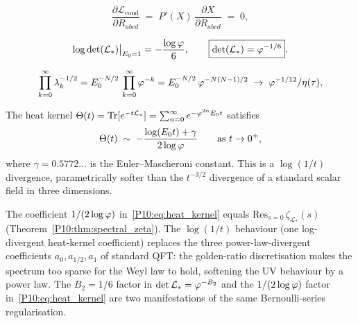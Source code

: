 \begin{equation}
  \frac{\partial\mathcal{L}_\mathrm{cond}}{\partial R_{abcd}}
  \;=\; P'(X)\,\frac{\partial X}{\partial R_{abcd}}
  \;=\; 0,
  \label{P10:eq:dLcond}
\end{equation}

\begin{equation}
  \log\det(\mathcal{L}_*)\big|_{E_0=1}
  = -\frac{\log\varphi}{6},
  \qquad
  \boxed{\det(\mathcal{L}_*) = \varphi^{-1/6}}.
  \label{P10:eq:det_E01}
\end{equation}

\begin{equation}
  \prod_{k=0}^\infty \lambda_k^{-1/2}
  = E_0^{-N/2}\,\prod_{k=0}^\infty\varphi^{-k}
  = E_0^{-N/2}\,\varphi^{-N(N-1)/2}\;\to\; \varphi^{-1/12}/\eta(\tau),
  \label{P10:eq:eta_connection}
\end{equation}

\begin{proposition}
\label{P10:prop:heat_kernel}
The heat kernel
$\Theta(t) = \mathrm{Tr}[e^{-t\mathcal{L}_*}]
= \sum_{n=0}^\infty e^{-\varphi^{2n}E_0 t}$
satisfies
\begin{equation}
  \Theta(t)
  \;\sim\; -\frac{\log(E_0 t)+\gamma}{2\log\varphi}
  \qquad\text{as }t\to0^+,
  \label{P10:eq:heat_kernel}
\end{equation}
where $\gamma = 0.5772\ldots$ is the Euler--Mascheroni constant.
This is a $\log(1/t)$ divergence, parametrically softer than the
$t^{-3/2}$ divergence of a standard scalar field in three dimensions.
\end{proposition}

\begin{remark}
\label{P10:rem:uv_softness_residue}
The coefficient $1/(2\log\varphi)$ in~\eqref{P10:eq:heat_kernel} equals
$\mathrm{Res}_{s=0}\,\zeta_{\mathcal{L}_*}(s)$
(Theorem~\ref{P10:thm:spectral_zeta}).
The $\log(1/t)$ behaviour (one log-divergent heat-kernel coefficient)
replaces the three power-law-divergent coefficients $a_0,a_{1/2},a_1$
of standard QFT: the golden-ratio discretisation
makes the spectrum too sparse for the Weyl law to hold, softening
the UV behaviour by a power law.
The $B_2=1/6$ factor in $\det\mathcal{L}_*=\varphi^{-B_2}$ and the
$1/(2\log\varphi)$ factor in~\eqref{P10:eq:heat_kernel} are two manifestations
of the same Bernoulli-series regularisation.
\end{remark}

